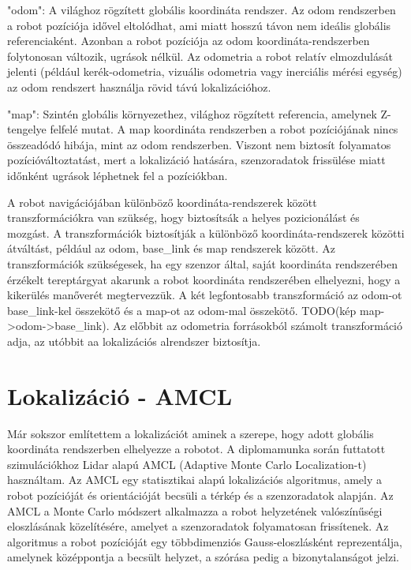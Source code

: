 "odom": A világhoz rögzített globális koordináta rendszer. Az odom rendszerben a robot pozíciója idővel eltolódhat, ami miatt hosszú távon nem ideális globális referenciaként. Azonban a robot pozíciója az odom koordináta-rendszerben folytonosan változik, ugrások nélkül. Az odometria a robot relatív elmozdulását jelenti (például kerék-odometria, vizuális odometria vagy inerciális mérési egység) az odom rendszert használja rövid távú lokalizációhoz.

"map": Szintén globális környezethez, világhoz rögzített referencia, amelynek Z-tengelye felfelé mutat. A map koordináta rendszerben a robot pozíciójának nincs összeadódó hibája, mint az odom rendszerben. Viszont nem biztosít folyamatos pozícióváltoztatást, mert a lokalizáció hatására, szenzoradatok frissülése miatt időnként ugrások léphetnek fel a pozíciókban.

A robot navigációjában különböző koordináta-rendszerek között transzformációkra van szükség, hogy biztosítsák a helyes pozicionálást és mozgást. A transzformációk biztosítják a különböző koordináta-rendszerek közötti átváltást, például az odom, base\_link és map rendszerek között. Az transzformációk szükségesek, ha egy szenzor által, saját koordináta rendszerében érzékelt tereptárgyat akarunk a robot koordináta rendszerében elhelyezni, hogy a kikerülés manőverét megtervezzük. A két legfontosabb transzformáció az odom-ot base\_link-kel összekötő és a map-ot az odom-mal összekötő.
TODO(kép map->odom->base\_link). Az előbbit az odometria forrásokból számolt transzformáció adja, az utóbbit aa lokalizációs alrendszer biztosítja. \cite{ros_wiki} \cite{ros2_design}

\section{Lokalizáció - AMCL}
Már sokszor említettem a lokalizációt aminek a szerepe, hogy adott globális koordináta rendszerben elhelyezze a robotot. A diplomamunka során futtatott szimulációkhoz Lidar alapú AMCL (Adaptive Monte Carlo Localization-t) használtam. Az AMCL egy statisztikai alapú lokalizációs algoritmus, amely a robot pozícióját és orientációját becsüli a térkép és a szenzoradatok alapján. Az AMCL a Monte Carlo módszert alkalmazza a robot helyzetének valószínűségi eloszlásának közelítésére, amelyet a szenzoradatok folyamatosan frissítenek. Az algoritmus a robot pozícióját egy többdimenziós Gauss-eloszlásként reprezentálja, amelynek középpontja a becsült helyzet, a szórása pedig a bizonytalanságot jelzi. \cite{nav2}